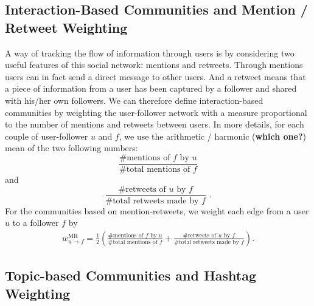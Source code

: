 \subsection{Interaction-Based Communities and Mention / Retweet Weighting}
\label{sec:method-interaction}

A way of tracking the flow of information through users is by considering two useful features of this social network: mentions and retweets. Through mentions users can in fact send a direct message to other users. And a retweet means that a piece of information from a user has been captured by a follower and shared with his/her own followers. We can therefore define interaction-based communities by weighting the user-follower network with a measure proportional to the number of mentions and retweets between users. In more details, for each couple of user-follower $u$ and $f$, we use the arithmetic / harmonic (\textbf{which one?}) mean of the two following numbers:
\begin{equation}
\frac{\mbox{\# mentions of }f \mbox{ by }u}{\mbox{\# total mentions of }f}
\end{equation}
and
\begin{equation}
\frac{\mbox{\# retweets of }u \mbox{ by }f}{\mbox{\# total retweets made by }f} \mbox{ .}
\end{equation}
For the communities based on mention-retweets, we weight each edge from a user $u$ to a follower $f$ by 
\begin{align}
	w_{u \to f}^{\text{MR}} = \frac{1}{2}\left(\frac{\mbox{\# mentions of }f \mbox{ by }u}{\mbox{\# total mentions of }f} + \frac{\mbox{\# retweets of }u \mbox{ by }f}{\mbox{\# total retweets made by }f}\right).
\end{align} 

\subsection{Topic-based Communities and Hashtag Weighting}
\label{sec:method-topic}

